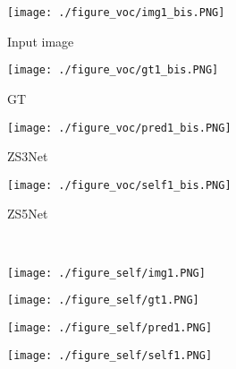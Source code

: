\documentclass{article}
\begin{document}
\begin{figure*}[t!]
	\begin{center}
		\begin{subfigure}[t]{0.24\textwidth}\centering 
			\caption{Input image}\vspace{-0.2cm}
			\texttt{[image: ./figure\_voc/img1\_bis.PNG]}
		\end{subfigure}
		\begin{subfigure}[t]{0.24\textwidth}\centering
			\caption{GT}\vspace{-0.2cm}
			\texttt{[image: ./figure\_voc/gt1\_bis.PNG]}
		\end{subfigure}
		\begin{subfigure}[t]{0.24\textwidth}\centering
			\caption{ZS3Net}\vspace{-0.2cm}
			\texttt{[image: ./figure\_voc/pred1\_bis.PNG]}
		\end{subfigure}
		\begin{subfigure}[t]{0.24\textwidth}\centering
			\caption{ZS5Net}\vspace{-0.2cm}
			\texttt{[image: ./figure\_voc/self1\_bis.PNG]}
		\end{subfigure}\\
		\begin{subfigure}[t]{0.24\textwidth}\centering
			\texttt{[image: ./figure\_self/img1.PNG]}
		\end{subfigure}
		\begin{subfigure}[t]{0.24\textwidth}\centering
			\texttt{[image: ./figure\_self/gt1.PNG]}
		\end{subfigure}
		\begin{subfigure}[t]{0.24\textwidth}\centering
			\texttt{[image: ./figure\_self/pred1.PNG]}
		\end{subfigure}
		\begin{subfigure}[t]{0.24\textwidth}\centering
			\texttt{[image: ./figure\_self/self1.PNG]}
		\end{subfigure}\\\vspace{0.1cm}
	\end{center}

\end{figure*}
\end{document}
